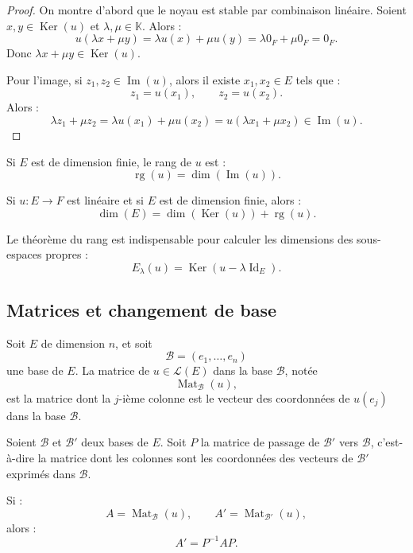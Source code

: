 \documentclass[11pt,a4paper]{article}
\newcommand{\K}{\mathbb K}
\newcommand{\Lcal}{\mathcal L}
\newcommand{\Ker}{\operatorname{Ker}}
\newcommand{\Imf}{\operatorname{Im}}
\newcommand{\rg}{\operatorname{rg}}
\newcommand{\Id}{\operatorname{Id}}
\begin{document}
\begin{proof}
On montre d'abord que le noyau est stable par combinaison linéaire.  
Soient \(x,y\in\Ker(u)\) et \(\lambda,\mu\in\K\). Alors :
\[
u(\lambda x+\mu y)=\lambda u(x)+\mu u(y)=\lambda 0_F+\mu 0_F=0_F.
\]
Donc \(\lambda x+\mu y\in\Ker(u)\).

Pour l'image, si \(z_1,z_2\in\Imf(u)\), alors il existe \(x_1,x_2\in E\) tels que :
\[
z_1=u(x_1),\qquad z_2=u(x_2).
\]
Alors :
\[
\lambda z_1+\mu z_2
=
\lambda u(x_1)+\mu u(x_2)
=
u(\lambda x_1+\mu x_2)\in\Imf(u).
\]
\end{proof}

\begin{definitionbox}[Rang]
Si \(E\) est de dimension finie, le rang de \(u\) est :
\[
\rg(u)=\dim(\Imf(u)).
\]
\end{definitionbox}

\begin{theorembox}
Si \(u:E\to F\) est linéaire et si \(E\) est de dimension finie, alors :
\[
\dim(E)=\dim(\Ker(u))+\rg(u).
\]
\end{theorembox}

\begin{retenirbox}
Le théorème du rang est indispensable pour calculer les dimensions des sous-espaces propres :
\[
E_\lambda(u)=\Ker(u-\lambda\Id_E).
\]
\end{retenirbox}

\subsection{Matrices et changement de base}

\begin{definitionbox}
Soit \(E\) de dimension \(n\), et soit
\[
\mathcal B=(e_1,\dots,e_n)
\]
une base de \(E\).  
La matrice de \(u\in\Lcal(E)\) dans la base \(\mathcal B\), notée
\[
\operatorname{Mat}_{\mathcal B}(u),
\]
est la matrice dont la \(j\)-ième colonne est le vecteur des coordonnées de \(u(e_j)\) dans la base \(\mathcal B\).
\end{definitionbox}

\begin{theorembox}
Soient \(\mathcal B\) et \(\mathcal B'\) deux bases de \(E\).  
Soit \(P\) la matrice de passage de \(\mathcal B'\) vers \(\mathcal B\), c'est-à-dire la matrice dont les colonnes sont les coordonnées des vecteurs de \(\mathcal B'\) exprimés dans \(\mathcal B\).

Si :
\[
A=\operatorname{Mat}_{\mathcal B}(u),
\qquad
A'=\operatorname{Mat}_{\mathcal B'}(u),
\]
alors :
\[
A'=P^{-1}AP.
\]
\end{theorembox}
\end{document}

